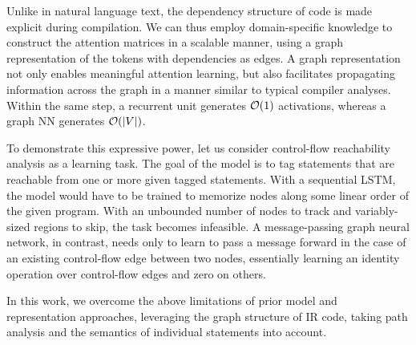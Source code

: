 Unlike in natural language text, the dependency structure of code is
made explicit during compilation. We can thus employ domain-specific
knowledge to construct the attention matrices in a scalable manner,
using a graph representation of the tokens with dependencies as
edges. A graph representation not only enables meaningful attention
learning, but also facilitates propagating information across the
graph in a manner similar to typical compiler analyses. Within the
same step, a recurrent unit generates $\mathcal{O}(1)$ activations, whereas
a graph NN generates $\mathcal{O}(|V|)$.

To demonstrate this expressive power, let us consider control-flow
reachability analysis as a learning task. The goal of the model is to
tag statements that are reachable from one or more given tagged
statements. With a sequential LSTM, the model would have to be trained
to memorize nodes along some linear order of the given program. With
an unbounded number of nodes to track and variably-sized regions to
skip, the task becomes infeasible. A message-passing graph neural
network, in contrast, needs only to learn to pass a message forward in
the case of an existing control-flow edge between two nodes,
essentially learning an identity operation over control-flow edges and
zero on others.

In this work, we overcome the above limitations of prior model and
representation approaches, leveraging the graph structure of IR code,
taking path analysis and the semantics of individual statements into
account.
